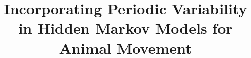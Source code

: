 \documentclass{bmcart}
\begin{document}

\begin{frontmatter}

\begin{fmbox}



\title{Incorporating Periodic Variability in Hidden Markov Models for Animal Movement}


\author[
   addressref={aff1},                   %
   email={lim88@mcmaster.ca}   %
]
{ }
\author[
   addressref={aff1,aff2},
   email={bolker@mcmaster.ca}
]{ }


\address[id=aff1]{                            %
  , %
  ,                     %
  ,                                %
  ,                              %
}
\address[id=aff2]{
  ,
  ,
  ,
  ,
}


\end{fmbox}
\end{frontmatter}
\end{document}
